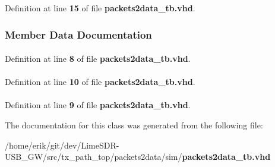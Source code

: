 Definition at line {\bf 15} of file {\bf packets2data\+\_\+tb.\+vhd}.



\subsubsection{Member Data Documentation}
\paragraph[{ieee}]{\hspace{0.3cm}{\ttfamily [Library]}}\label{classpackets2data__tb_a0a6af6eef40212dbaf130d57ce711256}


Definition at line {\bf 8} of file {\bf packets2data\+\_\+tb.\+vhd}.

\paragraph[{numeric\+\_\+std}]{\hspace{0.3cm}{\ttfamily [Package]}}\label{classpackets2data__tb_a2edc34402b573437d5f25fa90ba4013e}


Definition at line {\bf 10} of file {\bf packets2data\+\_\+tb.\+vhd}.

\paragraph[{std\+\_\+logic\+\_\+1164}]{\hspace{0.3cm}{\ttfamily [Package]}}\label{classpackets2data__tb_acd03516902501cd1c7296a98e22c6fcb}


Definition at line {\bf 9} of file {\bf packets2data\+\_\+tb.\+vhd}.



The documentation for this class was generated from the following file\+:\begin{DoxyCompactItemize}
\item 
/home/erik/git/dev/\+Lime\+S\+D\+R-\/\+U\+S\+B\+\_\+\+G\+W/src/tx\+\_\+path\+\_\+top/packets2data/sim/{\bf packets2data\+\_\+tb.\+vhd}\end{DoxyCompactItemize}
